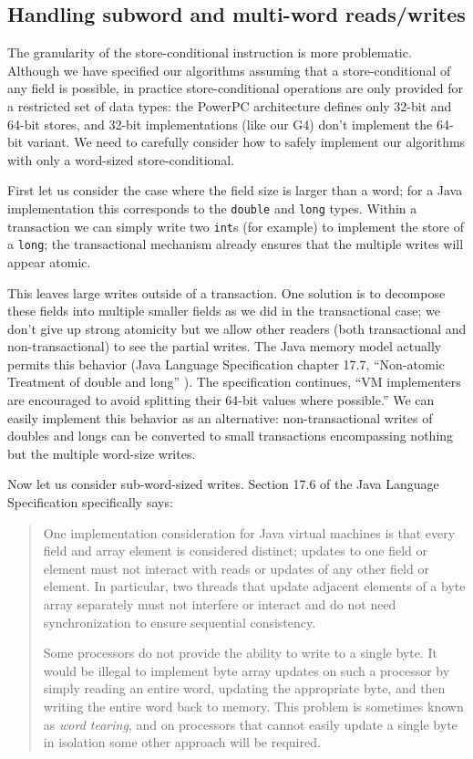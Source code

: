 \subsection{Handling subword and multi-word reads/writes}
\label{sec:multiword}
The granularity of the store-conditional instruction is more
problematic.  Although we have specified our algorithms assuming that
a store-conditional of any field is possible, in practice
store-conditional operations are only provided for a restricted set of
data types: the PowerPC architecture defines only 32-bit and 64-bit
stores, and 32-bit implementations (like our G4) don't implement the 64-bit
variant.  We need to carefully consider how to safely implement our
algorithms with only a word-sized store-conditional.

First let us consider the case where the field size is larger than a
word; for a Java implementation this corresponds to the
\texttt{double} and \texttt{long} types.  Within a transaction we can
simply write two \texttt{int}s (for example) to implement the store of
a \texttt{long}; the transactional mechanism already ensures that the
multiple writes will appear atomic.

This leaves large writes outside of a transaction.  One
solution is to decompose these fields into multiple smaller fields as
we did in the transactional case; we don't give up strong atomicity
but we allow other readers (both transactional and non-transactional)
to see the partial writes.  The Java memory model actually permits
this behavior (Java Language Specification chapter 17.7,
``Non-atomic Treatment of double and long'' \cite{JLS3}).  The specification
continues, ``VM implementers are encouraged to avoid splitting their
64-bit values where possible.''  We can easily implement this behavior
as an alternative: non-transactional writes of doubles and longs can be
converted to small transactions encompassing nothing but the multiple
word-size writes.

Now let us consider sub-word-sized writes.  Section 17.6 of the Java
Language Specification specifically says:
\begin{quote}
One implementation consideration for Java virtual machines is that
every field and array element is considered distinct; updates to one
field or element must not interact with reads or updates of any other
field or element. In particular, two threads that update adjacent
elements of a byte array separately must not interfere or interact and
do not need synchronization to ensure sequential consistency.

Some processors do not provide the ability to write to a single
byte. It would be illegal to implement byte array updates on such a
processor by simply reading an entire word, updating the appropriate
byte, and then writing the entire word back to memory. This problem is
sometimes known as \textit{word tearing}, and on processors that cannot easily
update a single byte in isolation some other approach will be
required.
\end{quote}

